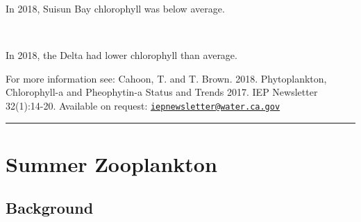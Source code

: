 \documentclass[
]{book}
\begin{document}
\begin{panel-grid}
\begin{columns-nocenter}
\begin{column40}
\end{column40}

\begin{column800}

In 2018, Suisun Bay chlorophyll was below average.

\end{column800}

\begin{column40}

~

\end{column40}

\begin{column800}

In 2018, the Delta had lower chlorophyll than average.

\end{column800}

\end{columns-nocenter}

\end{panel-grid}

\begin{disclaimer}
For more information see: Cahoon, T. and T. Brown. 2018. Phytoplankton,
Chlorophyll-a and Pheophytin-a Status and Trends 2017. IEP Newsletter
32(1):14-20. Available on request:
\href{mailto:iepnewsletter@water.ca.gov}{\nolinkurl{iepnewsletter@water.ca.gov}}
\end{disclaimer}

\begin{center}\rule{0.5\linewidth}{0.5pt}\end{center}

\hypertarget{summer-zooplankton}{%
\section{Summer Zooplankton}\label{summer-zooplankton}}

\hypertarget{background-3}{%
\subsection{Background}\label{background-3}}
\end{document}
